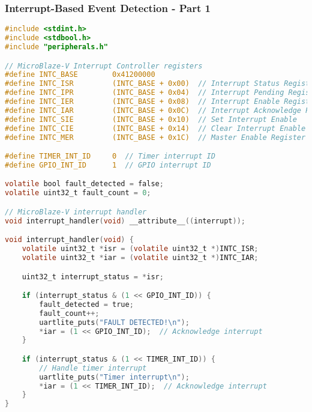 \documentclass{beamer}
\begin{document}
\begin{frame}[fragile]
\frametitle{Interrupt-Based Event Detection - Part 1}
\begin{lstlisting}[language=C, basicstyle=\fontsize{4}{2}\selectfont\ttfamily, backgroundcolor={}]
#include <stdint.h>
#include <stdbool.h>
#include "peripherals.h"

// MicroBlaze-V Interrupt Controller registers
#define INTC_BASE        0x41200000
#define INTC_ISR         (INTC_BASE + 0x00)  // Interrupt Status Register
#define INTC_IPR         (INTC_BASE + 0x04)  // Interrupt Pending Register
#define INTC_IER         (INTC_BASE + 0x08)  // Interrupt Enable Register
#define INTC_IAR         (INTC_BASE + 0x0C)  // Interrupt Acknowledge Register
#define INTC_SIE         (INTC_BASE + 0x10)  // Set Interrupt Enable
#define INTC_CIE         (INTC_BASE + 0x14)  // Clear Interrupt Enable
#define INTC_MER         (INTC_BASE + 0x1C)  // Master Enable Register

#define TIMER_INT_ID     0  // Timer interrupt ID
#define GPIO_INT_ID      1  // GPIO interrupt ID

volatile bool fault_detected = false;
volatile uint32_t fault_count = 0;

// MicroBlaze-V interrupt handler
void interrupt_handler(void) __attribute__((interrupt));

void interrupt_handler(void) {
    volatile uint32_t *isr = (volatile uint32_t *)INTC_ISR;
    volatile uint32_t *iar = (volatile uint32_t *)INTC_IAR;

    uint32_t interrupt_status = *isr;

    if (interrupt_status & (1 << GPIO_INT_ID)) {
        fault_detected = true;
        fault_count++;
        uartlite_puts("FAULT DETECTED!\n");
        *iar = (1 << GPIO_INT_ID);  // Acknowledge interrupt
    }

    if (interrupt_status & (1 << TIMER_INT_ID)) {
        // Handle timer interrupt
        uartlite_puts("Timer interrupt\n");
        *iar = (1 << TIMER_INT_ID);  // Acknowledge interrupt
    }
}

\end{lstlisting}
\end{frame}
\end{document}
